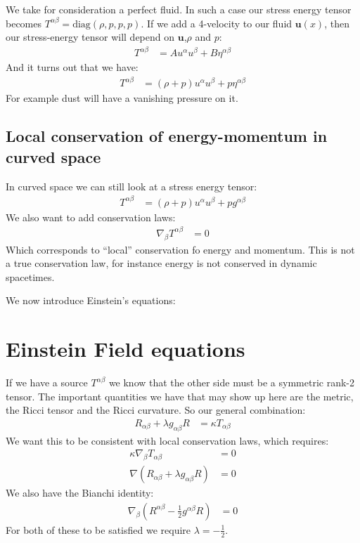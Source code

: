 We take for consideration a perfect fluid. In such a case our stress energy tensor becomes $T^{\alpha\beta} = \text{diag}(\rho,p,p,p)$. If we add a 4-velocity to our fluid $\bm{u}(x)$, then our stress-energy tensor will depend on $\bm{u}$,$\rho$ and $p$:
\begin{align*}
	T^{\alpha\beta} &= A u^\alpha u^\beta + B \eta^{\alpha\beta}
\end{align*}
And it turns out that we have:
\begin{align*}
	T^{\alpha\beta} &= (\rho + p)u^\alpha u^\beta + p\eta^{\alpha\beta}
\end{align*}
For example dust will have a vanishing pressure on it.

\subsection{Local conservation of energy-momentum in curved space}
In curved space we can still look at a stress energy tensor:
\begin{align*}
	T^{\alpha\beta} &= (\rho + p)u^\alpha u^\beta + pg^{\alpha\beta}
\end{align*}
We also want to add conservation laws:
\begin{align*}
	\nabla_\beta T^{\alpha\beta} &= 0
\end{align*}
Which corresponds to ``local'' conservation fo energy and momentum. This is not a true conservation law, for instance energy is not conserved in dynamic spacetimes. 

We now introduce Einstein's equations:
\section{Einstein Field equations}
If we have a source $T^{\alpha\beta}$ we know that the other side must be a symmetric rank-2 tensor. The important quantities we have that may show up here are the metric, the Ricci tensor and the Ricci curvature. So our general combination:
\begin{align*}
	R_{\alpha\beta} + \lambda g_{\alpha\beta}R &= \kappa T_{\alpha\beta}
\end{align*}
We want this to be consistent with local conservation laws, which requires:
\begin{align*}
	\kappa \nabla_\beta T_{\alpha\beta} &= 0 \\
	\nabla(R_{\alpha\beta} + \lambda g_{\alpha\beta} R) &= 0
\end{align*}
We also have the Bianchi identity:
\begin{align*}
	\nabla_\beta(R^{\alpha\beta} - \frac{1}{2} g^{\alpha\beta} R) &= 0
\end{align*}
For both of these to be satisfied we require $\lambda = -\frac{1}{2}$.

